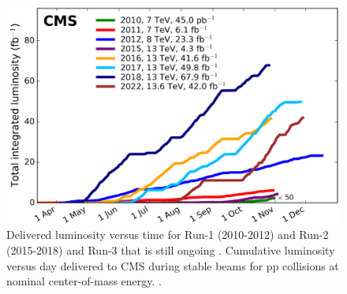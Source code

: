 \newpage
  \begin{center}
  \begin{figure}[ht]
    \centering
    \includegraphics[scale=.28]{Chapter1/int_lumi_per_year.png}
    \caption[CMS Luminosity per year]{Delivered luminosity versus time for Run-1 (2010-2012)\cite{pas_17} and Run-2 (2015-2018)\cite{pas_18} and Run-3 that is still ongoing . Cumulative luminosity versus day delivered to CMS during stable beams for pp collisions at nominal center-of-mass energy.  \cite{wikicern}.}
    \label{lumi_per_year_int}
  \end{figure}
    \end{center}

